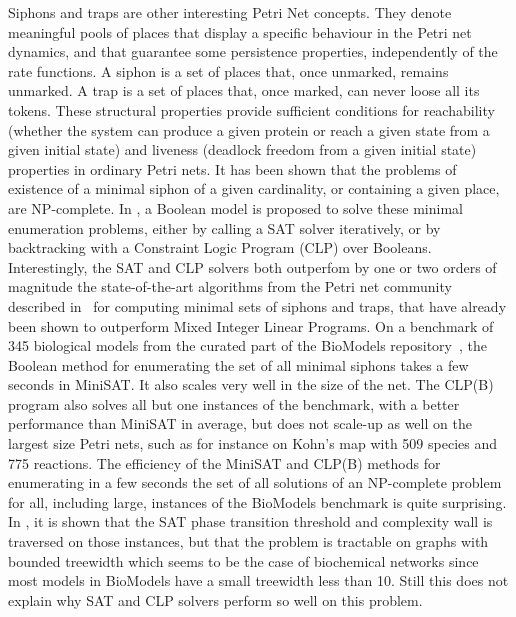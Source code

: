 \documentclass[graybox]{svmult}
\begin{document}
Siphons and traps are other interesting Petri Net concepts.
They denote meaningful pools of places that display a specific
behaviour in the Petri net dynamics, and that guarantee some persistence properties, independently of the rate functions.
A siphon is a set of places that, once unmarked, remains unmarked. A trap is a
set of places that, once marked, can never loose all its tokens.
These structural properties provide sufficient conditions 
for reachability (whether the system can produce a given protein or reach a given state from a given initial state) and liveness 
(deadlock freedom from a given initial state) properties in ordinary Petri nets.
It has been shown %
that the problems of existence of a minimal siphon
of a given cardinality, or containing a given place, are NP-complete. 
In \cite{NMFS16constraints}, 
a Boolean model is proposed to solve these minimal enumeration problems,
either by calling a SAT solver iteratively,
or by backtracking with a Constraint Logic Program (CLP)
over Booleans.
Interestingly, the SAT and CLP solvers both outperfom by one or two orders of magnitude
the state-of-the-art algorithms from the Petri net community described in~\cite{CFP05ieee} 
for computing minimal sets of siphons and traps,
that have already been shown to outperform
Mixed Integer Linear Programs. %
On a benchmark of 345 biological models from the curated part of the BioModels repository~\cite{NBBCDDLSSSSH06nar},
the Boolean method for enumerating the set of all minimal siphons
takes a few seconds in MiniSAT. It also scales very well in the size of the net.
The CLP(B) program also solves all but one instances of the benchmark,
with a better performance than MiniSAT in average, but does not scale-up as well on the largest size
Petri nets, such as for instance on Kohn's map with 509 species and 775 reactions.
The efficiency of the MiniSAT and CLP(B) methods 
for enumerating in a few seconds the set of all solutions of an NP-complete problem for
all, including large, instances of the BioModels benchmark
is quite surprising.
In \cite{NMFS16constraints}, it is shown that the SAT phase transition threshold and complexity wall is traversed on those instances,
but that the problem is tractable on graphs with bounded treewidth %
which seems to be the case of biochemical networks since most models in BioModels have a small treewidth less than 10.
Still this does not explain why SAT and CLP solvers perform so well on this problem.
\end{document}
